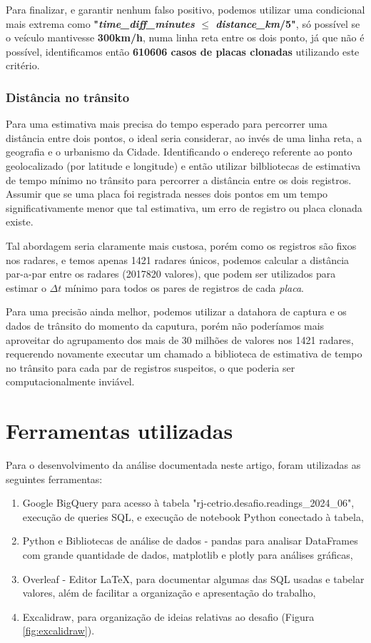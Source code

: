 \documentclass{article}
\begin{document}
Para finalizar, e garantir nenhum falso positivo, podemos utilizar uma condicional mais extrema como \textbf{"\textit{time\_diff\_minutes} $ \leq $ \textit{distance\_km}/5"}, só possível se o veículo mantivesse \textbf{300km/h}, numa linha reta entre os dois ponto, já que não é possível, identificamos então \textbf{610606 casos de placas clonadas} utilizando este critério.

\subsubsection{Distância no trânsito}

Para uma estimativa mais precisa do tempo esperado para percorrer uma distância entre dois pontos, o ideal seria considerar, ao invés de uma linha reta, a geografia e o urbanismo da Cidade. Identificando o endereço referente ao ponto geolocalizado (por latitude e longitude) e então utilizar bilbliotecas de estimativa de tempo mínimo no trânsito para percorrer a distância entre os dois registros. Assumir que se uma placa foi registrada nesses dois pontos em um tempo significativamente menor que tal estimativa, um erro de registro ou placa clonada existe.

Tal abordagem seria claramente mais custosa, porém como os registros são fixos nos radares, e temos apenas 1421 radares únicos, podemos calcular a distância par-a-par entre os radares (2017820 valores), que podem ser utilizados para estimar o $\Delta t$ mínimo para todos os pares de registros de cada \textit{placa}.

Para uma precisão ainda melhor, podemos utilizar a datahora de captura e os dados de trânsito do momento da caputura, porém não poderíamos mais aproveitar do agrupamento dos mais de 30 milhões de valores nos 1421 radares, requerendo novamente executar um chamado a biblioteca de estimativa de tempo no trânsito para cada par de registros suspeitos, o que poderia ser computacionalmente inviável.

\section{Ferramentas utilizadas}

Para o desenvolvimento da análise documentada neste artigo, foram utilizadas as seguintes ferramentas:

\begin{enumerate}
\item Google BigQuery para acesso à tabela "rj-cetrio.desafio.readings\_2024\_06", execução de queries SQL, e execução de notebook Python conectado à tabela,
\item Python e Bibliotecas de análise de dados - pandas para analisar DataFrames com grande quantidade de dados, matplotlib e plotly para análises gráficas,
\item Overleaf - Editor LaTeX, para documentar algumas das SQL usadas e tabelar valores, além de facilitar a organização e apresentação do trabalho,
\item Excalidraw, para organização de ideias relativas ao desafio (Figura \ref{fig:excalidraw}).
\end{enumerate}
\end{document}
